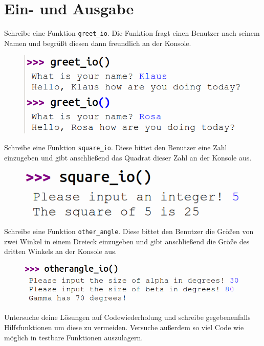\documentclass[class=scrartcl, crop=false]{standalone}
\begin{document}
\section{Ein- und Ausgabe}
\begin{aufgabe} \noindent 
	Schreibe eine Funktion \texttt{greet_io}. Die Funktion fragt einen Benutzer nach seinem Namen und begrüßt diesen dann freundlich an der Konsole.
	\begin{figure}[H]
		\centering
		\includegraphics[width=0.6\linewidth]{greet_io}
		
		\label{fig:greet_io}
	\end{figure}
\end{aufgabe}




\begin{aufgabe} \noindent 
Schreibe eine Funktion \texttt{square_io}. Diese bittet den Benutzer eine Zahl einzugeben und gibt anschließend das Quadrat dieser Zahl an der Konsole aus.
\begin{figure}[H]
	\centering
	\includegraphics[width=0.6\linewidth]{square_io}

	\label{fig:square_io}
\end{figure}

\end{aufgabe}
\begin{aufgabe} \noindent 
	Schreibe eine Funktion \texttt{other_angle}. Diese bittet den Benutzer die Größen von zwei Winkel in einem Dreieck einzugeben und gibt anschließend die Größe des dritten Winkels an der Konsole aus.
	\begin{figure}[H]
		\centering
		\includegraphics[width=0.6\linewidth]{other_angle_io}
		
		\label{fig:square_io}
	\end{figure}



\end{aufgabe}

\begin{aufgabe}
Untersuche deine Lösungen auf Codewiederholung und schreibe gegebenenfalls Hilfsfunktionen um diese zu vermeiden. Versuche außerdem so viel Code wie möglich in testbare Funktionen auszulagern.
\end{aufgabe}
\end{document}
